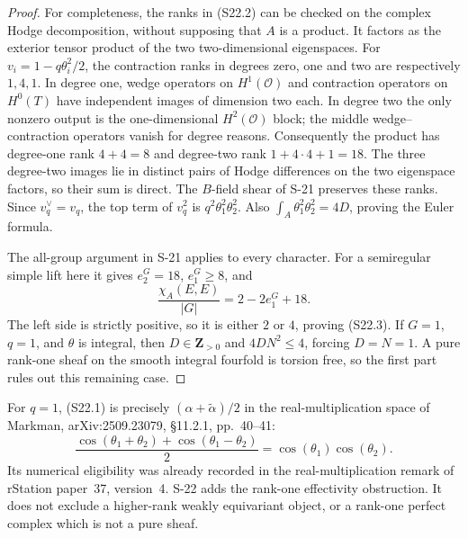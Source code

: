 \documentclass[11pt,a4paper]{article}
\theoremstyle{definition}
\begin{document}
\begin{proof}
For completeness, the ranks in (S22.2) can be checked on
the complex Hodge decomposition, without supposing that
$A$ is a product. It factors as the exterior tensor product
of the two two-dimensional eigenspaces. For
$v_i=1-q\theta_i^2/2$, the contraction ranks in degrees
zero, one and two are respectively $1,4,1$.
In degree one, wedge operators on $H^1(\mathcal O)$ and
contraction operators on $H^0(T)$ have independent images
of dimension two each. In degree two the only nonzero
output is the one-dimensional $H^2(\mathcal O)$ block;
the middle wedge--contraction operators vanish for degree
reasons. Consequently the product has degree-one rank
$4+4=8$ and degree-two rank $1+4\cdot4+1=18$.
The three degree-two images lie in distinct pairs of Hodge
differences on the two eigenspace factors, so their sum is
direct. The $B$-field shear of S-21 preserves these ranks.
Since $v_q^\vee=v_q$, the top term of $v_q^2$ is
$q^2\theta_1^2\theta_2^2$. Also
$\int_A\theta_1^2\theta_2^2=4D$, proving the Euler formula.

The all-group argument in S-21 applies to every character.
For a semiregular simple lift here it gives $e_2^G=18$,
$e_1^G\ge8$, and
\[
 \frac{\chi_A(E,E)}{|G|}=2-2e_1^G+18.
\]
The left side is strictly positive, so it is either $2$ or
$4$, proving (S22.3). If $G=1$, $q=1$, and $\theta$ is
integral, then $D\in\mathbf Z_{>0}$ and
$4DN^2\le4$, forcing $D=N=1$.
A pure rank-one sheaf on the smooth integral fourfold is
torsion free, so the first part rules out this remaining
case.
\end{proof}

For $q=1$, (S22.1) is precisely
$(\alpha+\widetilde\alpha)/2$ in the real-multiplication
space of Markman, arXiv:2509.23079, \S11.2.1, pp.~40--41:
\[
 \frac{\cos(\theta_1+\theta_2)+
             \cos(\theta_1-\theta_2)}2
       =\cos(\theta_1)\cos(\theta_2).
\]
Its numerical eligibility was already recorded in the
real-multiplication remark of rStation paper~37, version~4.
S-22 adds the rank-one effectivity obstruction. It does
not exclude a higher-rank weakly equivariant object, or a
rank-one perfect complex which is not a pure sheaf.
\end{document}
